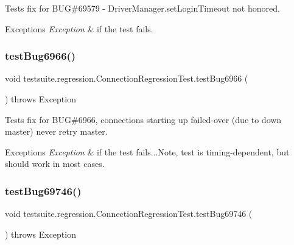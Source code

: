 Tests fix for B\+UG\#69579 -\/ Driver\+Manager.\+set\+Login\+Timeout not honored.


\begin{DoxyExceptions}{Exceptions}
{\em Exception} & if the test fails. \\
\hline
\end{DoxyExceptions}
\mbox{\label{classtestsuite_1_1regression_1_1_connection_regression_test_ad40619b88e8c45d0c604f376a8d0fd91}} 
\subsubsection{\texorpdfstring{test\+Bug6966()}{testBug6966()}}
{\footnotesize\ttfamily void testsuite.\+regression.\+Connection\+Regression\+Test.\+test\+Bug6966 (\begin{DoxyParamCaption}{ }\end{DoxyParamCaption}) throws Exception}

Tests fix for B\+UG\#6966, connections starting up failed-\/over (due to down master) never retry master.


\begin{DoxyExceptions}{Exceptions}
{\em Exception} & if the test fails...Note, test is timing-\/dependent, but should work in most cases. \\
\hline
\end{DoxyExceptions}
\mbox{\label{classtestsuite_1_1regression_1_1_connection_regression_test_adeeac09d039c69e054e676529af26ca7}} 
\subsubsection{\texorpdfstring{test\+Bug69746()}{testBug69746()}}
{\footnotesize\ttfamily void testsuite.\+regression.\+Connection\+Regression\+Test.\+test\+Bug69746 (\begin{DoxyParamCaption}{ }\end{DoxyParamCaption}) throws Exception}

